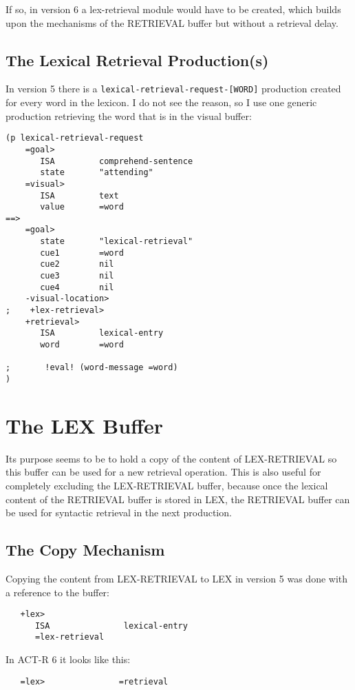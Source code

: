 \documentclass[nobf,fignum,doc,longtable]{apa}
\begin{document}
If so, in version 6 a lex-retrieval module would have to be created, which builds upon the mechanisms of the RETRIEVAL buffer but without a retrieval delay.

\subsection{The Lexical Retrieval Production(s)}
In version 5 there is a \texttt{lexical-retrieval-request-[WORD]} production created for every word in the lexicon. I do not see the reason, so I use one generic production retrieving the word that is in the visual buffer:

{\scriptsize \begin{verbatim}
(p lexical-retrieval-request
    =goal>
       ISA         comprehend-sentence
       state	   "attending"
    =visual>
       ISA         text
       value       =word
==>
    =goal>
       state       "lexical-retrieval"
       cue1        =word
       cue2        nil
       cue3        nil
       cue4        nil
    -visual-location>
;    +lex-retrieval>
    +retrieval>
       ISA         lexical-entry
       word        =word
        
;       !eval! (word-message =word)
)
\end{verbatim}}


\section{The LEX Buffer}
Its purpose seems to be to hold a copy of the content of LEX-RETRIEVAL so this buffer can be used for a new retrieval operation.
This is also useful for completely excluding the LEX-RETRIEVAL buffer, because once the lexical content of the RETRIEVAL buffer is stored in LEX, the RETRIEVAL buffer can be used for syntactic retrieval in the next production. 

\subsection{The Copy Mechanism}
Copying the content from LEX-RETRIEVAL to LEX in version 5 was done with a reference to the buffer: 
{\scriptsize \begin{verbatim}
   +lex>
      ISA               lexical-entry
      =lex-retrieval
\end{verbatim}}

In ACT-R 6 it looks like this:

{\scriptsize \begin{verbatim}
   =lex>               =retrieval
\end{verbatim}}
\end{document}
